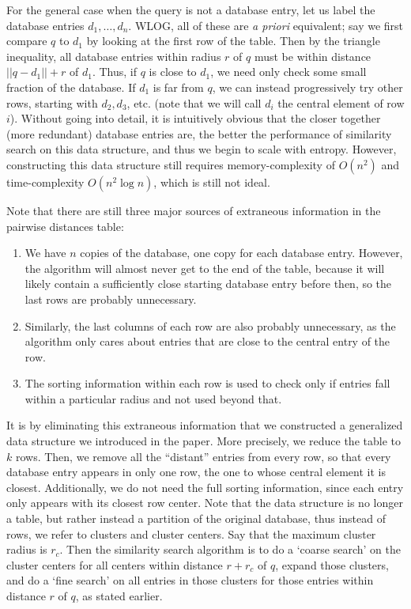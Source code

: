 \documentclass[review,preprint,12pt]{elsarticle}
\theoremstyle{definition}
\theoremstyle{remark}
\numberwithin{equation}{section}
\begin{document}
For the general case when the query is not a database entry, let us label the database entries $d_1, \ldots, d_n$.
WLOG, all of these are \textit{a priori} equivalent; say we first compare $q$ to $d_1$ by looking at the first row of the table.
Then by the triangle inequality, all database entries within radius $r$ of $q$ must be within distance $||q-d_1|| +r$ of $d_1$.
Thus, if $q$ is close to $d_1$, we need only check some small fraction of the database.
If $d_1$ is far from $q$, we can instead progressively try other rows, starting with $d_2, d_3$, etc.
(note that we will call $d_i$ the central element of row $i$).
Without going into detail, it is intuitively obvious that the closer together (more redundant) database entries are, the better the performance of similarity search on this data structure, and thus we begin to scale with entropy.
However, constructing this data structure still requires memory-complexity of $O(n^2)$ and time-complexity $O(n^2 \log n)$, which is still not ideal.

Note that there are still three major sources of extraneous information in the pairwise distances table:

\begin{enumerate}
    \item We have $n$ copies of the database, one copy for each database entry.
However, the algorithm will almost never get to the end of the table, because it will likely contain a sufficiently close starting database entry before then, so the last rows are probably unnecessary.
    \item Similarly, the last columns of each row are also probably unnecessary, as the algorithm only cares about entries that are close to the central entry of the row.
    \item The sorting information within each row is used to check only if entries fall within a particular radius and not used beyond that.
\end{enumerate}

It is by eliminating this extraneous information that we constructed a generalized data structure we introduced in the paper.
More precisely, we reduce the table to $k$ rows.
Then, we remove all the ``distant'' entries from every row, so that every database entry appears in only one row, the one to whose central element it is closest.
Additionally, we do not need the full sorting information, since each entry only appears with its closest row center.
Note that the data structure is no longer a table, but rather instead a partition of the original database, thus instead of rows, we refer to clusters and cluster centers.
Say that the maximum cluster radius is $r_c$.
Then the similarity search algorithm is to do a `coarse search' on the cluster centers for all centers within distance $r+r_c$ of $q$, expand those clusters, and do a ‘fine search’ on all entries in those clusters for those entries within distance $r$ of $q$, as stated earlier.
\end{document}
